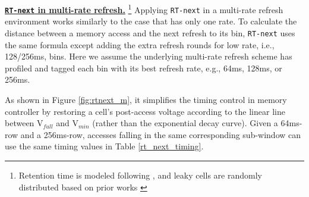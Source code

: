 

\vspace{0.1in} 
{\underline{\bf {\tt RT-next} in multi-rate refresh.}}
\footnote{Retention time is modeled following \cite{EDL09:ret,ISCA12:raidr,ISCA13:archshield}, and leaky cells are randomly distributed based on prior works \cite{ISCA12:raidr, ISCA15:reflex, ICCD14:proactive}}
Applying {\tt RT-next} in a multi-rate refresh environment works similarly to the case that has only one rate. To calculate the distance between a memory access and the next refresh to its bin, 
{\tt RT-next} uses the same formula except adding the extra refresh rounds for low rate, i.e., 128/256ms, bins.
Here we assume the underlying multi-rate refresh scheme has profiled and tagged each bin with its best refresh rate, e.g., 64ms, 128ms, or 256ms. 

As shown in Figure \ref{fig:rtnext_m}, it simplifies the timing control in memory controller by restoring a cell's post-access voltage according to the linear line between V$_{full}$ and V$_{min}$ (rather than the exponential decay curve). Given a 64ms-row and a 256ms-row, accesses falling in the same corresponding sub-window can use the same timing values in Table \ref{rt_next_timing}. 

